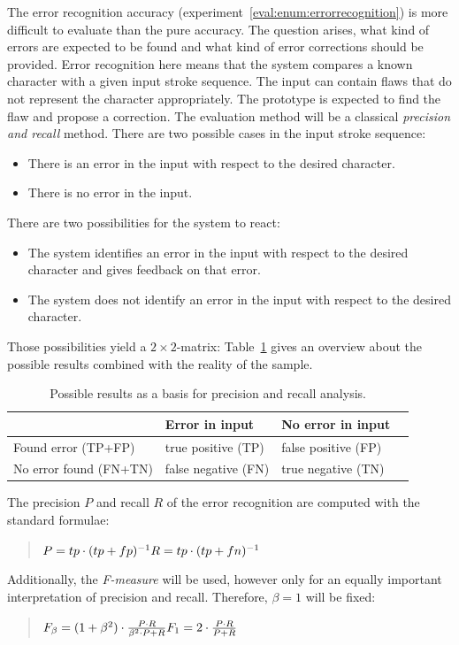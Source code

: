 The error recognition accuracy (experiment~\ref{eval:enum:errorrecognition}) 
is more difficult to evaluate than the pure accuracy.
The question arises, what kind of errors are expected to be found
and what kind of error corrections should be provided.
Error recognition here means that the system compares a known character with 
a given input stroke sequence. The input can contain flaws that do not 
represent the character appropriately. The prototype is expected to find the flaw
and propose a correction.
The evaluation method will be a classical \emph{precision and recall} method.
There are two possible cases in the input stroke sequence:
\begin{itemize}
  \item There is an error in the input with respect to the desired character.
  \item There is no error in the input.
\end{itemize}
There are two possibilities for the system to react:
\begin{itemize}
  \item The system identifies an error in the input with respect to the desired
        character and gives feedback on that error.
  \item The system does not identify an error in the input with respect to the
        desired character.
\end{itemize}
Those possibilities yield a \(2 \times 2\)-matrix:
Table~\ref{table:eval:resultsforprecisionandrecall} gives an overview about 
the possible results combined with the reality of the sample.

\begin{table}[htbp]
\begin{center}
  \begin{tabular}{|l|l|l|p{200pt}|}
    \hline
                           & Error in input      & No error in input \\
    \hline
    Found error (TP+FP)    & true positive (TP)  & false positive (FP) \\
    \hline
    No error found (FN+TN) & false negative (FN) & true negative (TN) \\
    \hline
  \end{tabular}
\end{center}
\caption{Possible results as a basis for precision and recall analysis.}
\label{table:eval:resultsforprecisionandrecall}
\end{table}
The precision \(P\) and recall \(R\) of the error recognition are computed 
with the standard formulae:
\begin{quote}
\(
P=tp \cdot (tp+fp)^{-1} \\
R=tp \cdot (tp+fn)^{-1} \\
\)  
\end{quote}
Additionally, the \emph{F-measure} will be used, however only for an equally 
important interpretation of precision and recall. Therefore, \(\beta = 1\) will
be fixed:
\begin{quote}
\(
F_{\beta} = (1 + \beta^2) \cdot \frac{P \cdot R }{ \beta^2 \cdot P + R} \\
F_{1} = 2 \cdot \frac{P \cdot R }{P + R} \\
\)
\end{quote}

